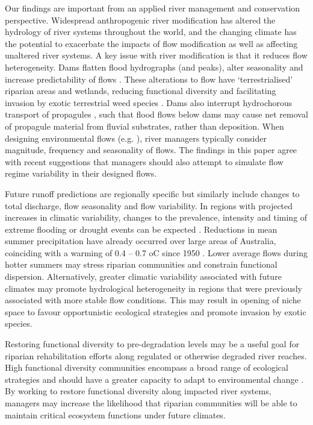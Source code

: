 \documentclass[openright,12pt,a4paper]{memoir}
\begin{document}
Our findings are important from an applied river management and conservation perspective. Widespread anthropogenic river modification has altered the hydrology of river systems throughout the world, and the changing climate has the potential to exacerbate the impacts of flow modification as well as affecting unaltered river systems. A key issue with river modification is that it reduces flow heterogeneity. Dams flatten flood hydrographs (and peaks), alter seasonality and increase predictability of flows \cite{Graf2006, Singer2007}. These alterations to flow have ‘terrestrialised’ riparian areas and wetlands, reducing functional diversity and facilitating invasion by exotic terrestrial weed species \cite{Catford2011}.  Dams also interrupt hydrochorous transport of propagules \cite{Merritt2010a}, such that flood flows below dams may cause net removal of propagule material from fluvial substrates, rather than deposition. When designing environmental flows (e.g. \cite{Howell2000}), river managers typically consider magnitude, frequency and seasonality of flows. The findings in this paper agree with recent suggestions \cite{Naiman2008} that managers should also attempt to simulate flow regime variability in their designed flows.
 
Future runoff predictions are regionally specific but similarly include changes to total discharge, flow seasonality and flow variability. In regions with projected increases in climatic variability, changes to the prevalence, intensity and timing of extreme flooding or drought events can be expected \cite{Hennessy2008}. Reductions in mean summer precipitation have already occurred over large areas of Australia, coinciding with a warming of 0.4 – 0.7 oC since 1950 \cite{Hennessy2007}. Lower average flows during hotter summers may stress riparian communities and constrain functional dispersion. Alternatively, greater climatic variability associated with future climates \cite{Hennessy2008} may promote hydrological heterogeneity in regions that were previously associated with more stable flow conditions. This may result in opening of niche space to favour opportunistic ecological strategies and promote invasion by exotic species.
 
Restoring functional diversity to pre-degradation levels may be a useful goal for riparian rehabilitation efforts along regulated or otherwise degraded river reaches. High functional diversity communities encompass a broad range of ecological strategies and should have a greater capacity to adapt to environmental change \cite{Tilman1997, Standish2014}. By working to restore functional diversity along impacted river systems, managers may increase the likelihood that riparian communities will be able to maintain critical ecosystem functions under future climates.
 
\end{document}

